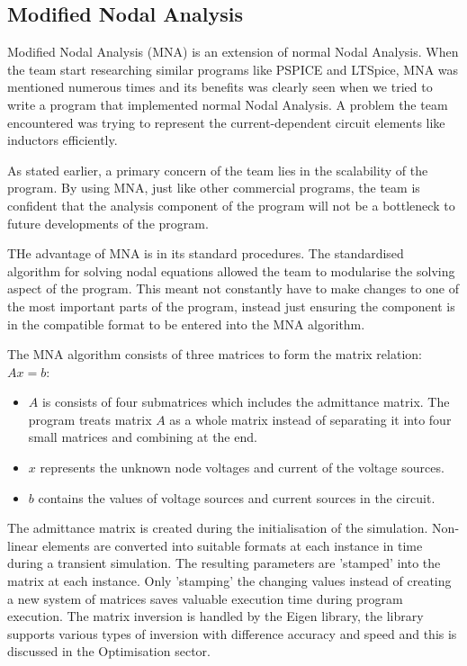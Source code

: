\documentclass[12pt,a4paper]{article}
\begin{document}
	\subsection{Modified Nodal Analysis}
	Modified Nodal Analysis (MNA) is an extension of normal Nodal Analysis. When the team start researching similar 
	programs like PSPICE and LTSpice, MNA was mentioned numerous times \cite{MNA} and its benefits was clearly seen when we tried 
	to write a program that implemented normal Nodal Analysis. A problem the team encountered was trying to 
	represent the current-dependent circuit elements like inductors efficiently. 
	\par
	As stated earlier, a primary concern of the team lies in the scalability of the program. By using MNA, just like
	other commercial programs, the team is confident that the analysis component of the program will not be a 
	bottleneck to future developments of the program.
	\par
	THe advantage of MNA is in its standard procedures. The standardised algorithm for solving nodal 
	equations allowed the team to modularise the solving aspect of the program. This meant not constantly have to 
	make changes to one of the most important parts of the program, instead just ensuring the component is in the 
	compatible format to be entered into the MNA algorithm.
	\par 
	The MNA algorithm consists of three matrices to form the matrix relation: $Ax=b$:
	\begin{itemize}
		\item $A$ is consists of four submatrices which includes the admittance matrix. The program treats matrix $A$ as 
		a whole matrix instead of separating it into four small matrices and combining at the end.
		\item $x$ represents the unknown node voltages and current of the voltage sources.
		\item $b$ contains the values of voltage sources and current sources in the circuit.
	\end{itemize}
	The admittance matrix is created during the initialisation of the simulation. Non-linear elements are converted into 
	suitable formats at each instance in time during a transient simulation. The resulting parameters are 'stamped' into the matrix
	at each instance. Only 'stamping' the changing values instead of creating a new system of matrices saves valuable execution time
	during program execution. The matrix inversion is handled by the Eigen library, the library supports various types of 
	inversion with difference accuracy and speed and this is discussed in the Optimisation sector.
\end{document}
